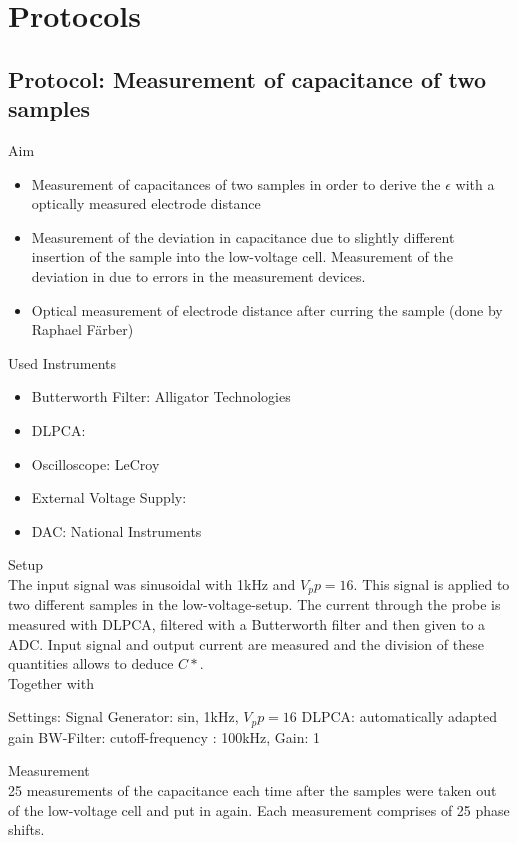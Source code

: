 \chapter{Protocols}
\section{Protocol: Measurement of capacitance of two samples}
\large{Aim} \\
\begin{itemize}

\item Measurement of capacitances of two samples in order to derive the $\epsilon$ with a optically measured electrode distance 
\item Measurement of the deviation in capacitance due to slightly different insertion of the sample into the low-voltage cell. Measurement of the deviation in due to errors in the measurement devices. 
\item Optical measurement of electrode distance after curring the sample (done by Raphael F\"arber) 
\end{itemize}

\large{Used Instruments} 
\begin{itemize}
 \item Butterworth Filter: Alligator Technologies 
 \item DLPCA: 
 \item Oscilloscope: LeCroy
 \item External Voltage Supply: 
 \item DAC: National Instruments 

\end{itemize}


\large{Setup} \\
The input signal was  sinusoidal with 1kHz and $V_pp=16$. This signal is applied to two different samples in the low-voltage-setup. The current through the probe is measured with DLPCA, filtered with a Butterworth filter and then given to a ADC. 
Input signal and output current are measured and the division of these quantities allows to deduce $C*$.\\

Together with 

Settings: \newline
Signal Generator:  sin, 1kHz, $V_pp=16$
DLPCA:  automatically adapted gain
BW-Filter:  cutoff-frequency : 100kHz, Gain: 1

\large{Measurement} \\
25 measurements of the capacitance each time after the samples were taken out of the low-voltage cell and put in again. Each measurement comprises of 25 phase shifts. 

